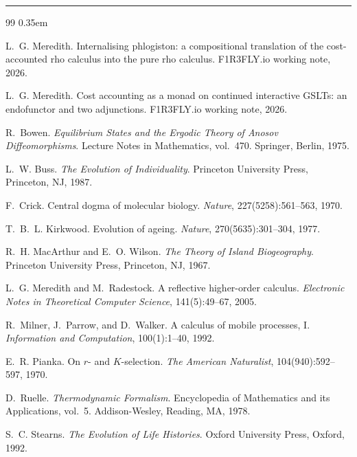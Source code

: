 \documentclass[11pt]{article}
\theoremstyle{plain}
\theoremstyle{definition}
\theoremstyle{remark}
\newcommand{\hrulethick}{\noindent\textcolor{f1r3}{\rule{\linewidth}{1.2pt}}}
\begin{document}
\vspace{0.5em}
\hrulethick

\begin{thebibliography}{99}
\itemsep0.35em

L.~G. Meredith.
\newblock Internalising phlogiston: a compositional translation of the
  cost-accounted rho calculus into the pure rho calculus.
\newblock F1R3FLY.io working note, 2026.

L.~G. Meredith.
\newblock Cost accounting as a monad on continued interactive GSLTs: an
  endofunctor and two adjunctions.
\newblock F1R3FLY.io working note, 2026.

R.~Bowen.
\newblock \emph{Equilibrium States and the Ergodic Theory of Anosov
  Diffeomorphisms}.
\newblock Lecture Notes in Mathematics, vol.~470. Springer, Berlin, 1975.

L.~W. Buss.
\newblock \emph{The Evolution of Individuality}.
\newblock Princeton University Press, Princeton, NJ, 1987.

F.~Crick.
\newblock Central dogma of molecular biology.
\newblock \emph{Nature}, 227(5258):561--563, 1970.

T.~B.~L. Kirkwood.
\newblock Evolution of ageing.
\newblock \emph{Nature}, 270(5635):301--304, 1977.

R.~H. MacArthur and E.~O. Wilson.
\newblock \emph{The Theory of Island Biogeography}.
\newblock Princeton University Press, Princeton, NJ, 1967.

L.~G. Meredith and M.~Radestock.
\newblock A reflective higher-order calculus.
\newblock \emph{Electronic Notes in Theoretical Computer Science},
  141(5):49--67, 2005.

R.~Milner, J.~Parrow, and D.~Walker.
\newblock A calculus of mobile processes, I.
\newblock \emph{Information and Computation}, 100(1):1--40, 1992.

E.~R. Pianka.
\newblock On $r$- and $K$-selection.
\newblock \emph{The American Naturalist}, 104(940):592--597, 1970.

D.~Ruelle.
\newblock \emph{Thermodynamic Formalism}.
\newblock Encyclopedia of Mathematics and its Applications, vol.~5.
  Addison-Wesley, Reading, MA, 1978.

S.~C. Stearns.
\newblock \emph{The Evolution of Life Histories}.
\newblock Oxford University Press, Oxford, 1992.


\end{thebibliography}
\end{document}
